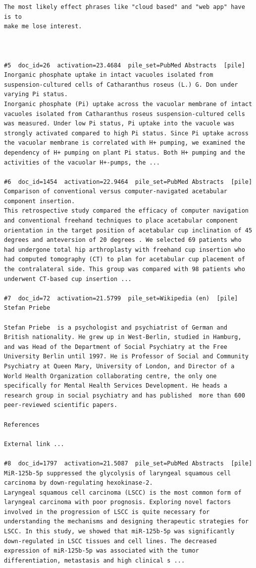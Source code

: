\begin{verbatim}
The most likely effect phrases like "cloud based" and "web app" have is to
make me lose interest.



#5  doc_id=26  activation=23.4684  pile_set=PubMed Abstracts  [pile]
Inorganic phosphate uptake in intact vacuoles isolated from suspension-cultured cells of Catharanthus roseus (L.) G. Don under varying Pi status.
Inorganic phosphate (Pi) uptake across the vacuolar membrane of intact vacuoles isolated from Catharanthus roseus suspension-cultured cells was measured. Under low Pi status, Pi uptake into the vacuole was strongly activated compared to high Pi status. Since Pi uptake across the vacuolar membrane is correlated with H+ pumping, we examined the dependency of H+ pumping on plant Pi status. Both H+ pumping and the activities of the vacuolar H+-pumps, the ...

#6  doc_id=1454  activation=22.9464  pile_set=PubMed Abstracts  [pile]
Comparison of conventional versus computer-navigated acetabular component insertion.
This retrospective study compared the efficacy of computer navigation and conventional freehand techniques to place acetabular component orientation in the target position of acetabular cup inclination of 45 degrees and anteversion of 20 degrees . We selected 69 patients who had undergone total hip arthroplasty with freehand cup insertion who had computed tomography (CT) to plan for acetabular cup placement of the contralateral side. This group was compared with 98 patients who underwent CT-based cup insertion ...

#7  doc_id=72  activation=21.5799  pile_set=Wikipedia (en)  [pile]
Stefan Priebe

Stefan Priebe  is a psychologist and psychiatrist of German and British nationality. He grew up in West-Berlin, studied in Hamburg, and was Head of the Department of Social Psychiatry at the Free University Berlin until 1997. He is Professor of Social and Community Psychiatry at Queen Mary, University of London, and Director of a World Health Organization collaborating centre, the only one specifically for Mental Health Services Development. He heads a research group in social psychiatry and has published  more than 600 peer-reviewed scientific papers.

References

External link ...

#8  doc_id=1797  activation=21.5087  pile_set=PubMed Abstracts  [pile]
MiR-125b-5p suppressed the glycolysis of laryngeal squamous cell carcinoma by down-regulating hexokinase-2.
Laryngeal squamous cell carcinoma (LSCC) is the most common form of laryngeal carcinoma with poor prognosis. Exploring novel factors involved in the progression of LSCC is quite necessary for understanding the mechanisms and designing therapeutic strategies for LSCC. In this study, we showed that miR-125b-5p was significantly down-regulated in LSCC tissues and cell lines. The decreased expression of miR-125b-5p was associated with the tumor differentiation, metastasis and high clinical s ...


\end{verbatim}
